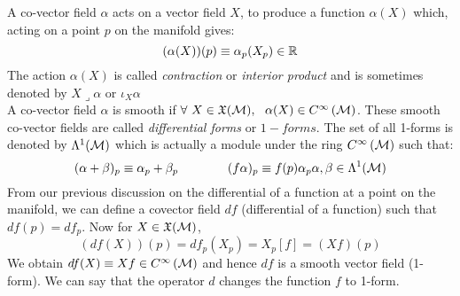 A co-vector field $\alpha$ acts on a vector field $X$, to produce a function $\alpha(X)$ which, acting on a point $p$ on the manifold gives:
$$(\alpha(X))(p)  \equiv \alpha_p(X_p) \in \mathbb{R}$$
The action $\alpha(X)$ is called \textit{contraction} or \textit{interior product} and is sometimes denoted by $X{\lrcorner \alpha}$ or $\iota_X \alpha$\\[0.2cm]
A co-vector field $\alpha$ is smooth if $\forall \ X \in \mathfrak{X}(\mathcal M),\ \ \alpha(X) \in C^{\infty}\left(\mathcal M\right)$. These smooth co-vector fields are called \textit{differential forms} or $1-forms$. The set of all 1-forms is denoted by $\Lambda^1(\mathcal M)$ which is actually a module under the ring $C^{\infty}\left(\mathcal M\right)$ such that:
$$(\alpha + \beta)_p\equiv \alpha_p+\beta_p \qquad\qquad (f\alpha)_p \equiv f(p)\alpha_p \alpha,\beta \in \Lambda^1(\mathcal M)$$
From our previous discussion on the differential of a function at a point on the manifold, we can define a covector field $df$ (differential of a function) such that $df(p) = df_p$. Now for $X\in \mathfrak{X}(\mathcal M)$,
$$(df(X))(p) = df_p(X_p) = X_p[f] = (Xf)(p)$$
We obtain $df(X)\equiv Xf \in C^{\infty}\left(\mathcal M\right)$ and hence $df$ is a smooth vector field (1-form). We can say that the operator $d$ changes the function $f$ to 1-form. 